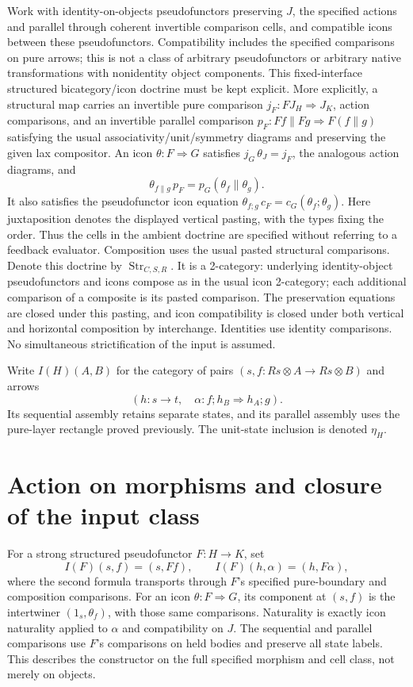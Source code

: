 \documentclass{article}
\begin{document}
Work with identity-on-objects pseudofunctors preserving $J$, the specified actions and parallel through coherent invertible comparison cells, and compatible icons between these pseudofunctors. Compatibility includes the specified comparisons on pure arrows; this is not a class of arbitrary pseudofunctors or arbitrary native transformations with nonidentity object components. This fixed-interface structured bicategory/icon doctrine must be kept explicit. More explicitly, a structural map carries an invertible pure comparison $j_F:FJ_H\Rightarrow J_K$, action comparisons, and an invertible parallel comparison $p_F:Ff\parallel Fg\Rightarrow F(f\parallel g)$ satisfying the usual associativity/unit/symmetry diagrams and preserving the given lax compositor. An icon $\theta:F\Rightarrow G$ satisfies $j_G\,\theta_J=j_F$, the analogous action diagrams, and
\[
\theta_{f\parallel g}\,p_F=p_G(\theta_f\parallel\theta_g).
\]
It also satisfies the pseudofunctor icon equation $\theta_{f;g}\,c_F=c_G(\theta_f;\theta_g)$. Here juxtaposition denotes the displayed vertical pasting, with the types fixing the order. Thus the cells in the ambient doctrine are specified without referring to a feedback evaluator. Composition uses the usual pasted structural comparisons. Denote this doctrine by $\operatorname{Str}_{C,S,R}$. It is a 2-category: underlying identity-object pseudofunctors and icons compose as in the usual icon 2-category; each additional comparison of a composite is its pasted comparison. The preservation equations are closed under this pasting, and icon compatibility is closed under both vertical and horizontal composition by interchange. Identities use identity comparisons. No simultaneous strictification of the input is assumed.

Write $I(H)(A,B)$ for the category of pairs $(s,f:Rs\otimes A\to Rs\otimes B)$ and arrows
\[
(h:s\to t,\quad\alpha:f;h_B\Rightarrow h_A;g).
\]
Its sequential assembly retains separate states, and its parallel assembly uses the pure-layer rectangle proved previously. The unit-state inclusion is denoted $\eta_H$.

\section{Action on morphisms and closure of the input class}
For a strong structured pseudofunctor $F:H\to K$, set
\[
I(F)(s,f)=(s,Ff),\qquad I(F)(h,\alpha)=(h,F\alpha),
\]
where the second formula transports through $F$'s specified pure-boundary and composition comparisons. For an icon $\theta:F\Rightarrow G$, its component at $(s,f)$ is the intertwiner $(1_s,\theta_f)$, with those same comparisons. Naturality is exactly icon naturality applied to $\alpha$ and compatibility on $J$. The sequential and parallel comparisons use $F$'s comparisons on held bodies and preserve all state labels. This describes the constructor on the full specified morphism and cell class, not merely on objects.
\end{document}
